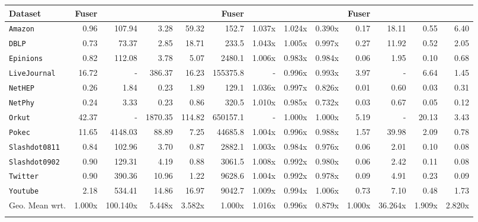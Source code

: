 \documentclass[10pt,journal,compsoc]{IEEEtran}
\newcommand\acro{{\sc{HyperFuseR\xspace}\xspace}\xspace}
\begin{document}
\begin{table}
{\begin{tabular}{l|rrrr|rrrr|rrrr}
Dataset      & {\sc Fuser} &         &         &         & {\sc Fuser} &         &         &         & {\sc Fuser} &       &       &      \\
\midrule
{\tt Amazon }       &       0.96 &  107.94 &    3.28 &  59.32 &      152.7 &  1.037x &  1.024x &  0.390x &       0.17 & 18.11 &  0.55 & 6.40 \\
{\tt DBLP }         &       0.73 &   73.37 &    2.85 &  18.71 &      233.5 &  1.043x &  1.005x &  0.997x &       0.27 & 11.92 &  0.52 & 2.05 \\
{\tt Epinions }     &       0.82 &  112.08 &    3.78 &   5.07 &     2480.1 &  1.006x &  0.983x &  0.984x &       0.06 &  1.95 &  0.10 & 0.68 \\
{\tt LiveJournal }  &      16.72 &       - &  386.37 &  16.23 &   155375.8 &       - &  0.996x &  0.993x &       3.97 &     - &  6.64 & 1.45 \\
{\tt NetHEP }       &       0.26 &    1.84 &    0.23 &   1.89 &      129.1 &  1.036x &  0.997x &  0.826x &       0.01 &  0.60 &  0.03 & 0.31 \\
{\tt NetPhy }       &       0.24 &    3.33 &    0.23 &   0.86 &      320.5 &  1.010x &  0.985x &  0.732x &       0.03 &  0.67 &  0.05 & 0.12 \\
{\tt Orkut }        &      42.37 &       - & 1870.35 & 114.82 &   650157.1 &       - &  1.000x &  1.000x &       5.19 &     - & 20.13 & 3.43 \\
{\tt Pokec }        &      11.65 & 4148.03 &   88.89 &   7.25 &    44685.8 &  1.004x &  0.996x &  0.988x &       1.57 & 39.98 &  2.09 & 0.78 \\
{\tt Slashdot0811 } &       0.84 &  102.96 &    3.70 &   0.87 &     2882.1 &  1.003x &  0.984x &  0.976x &       0.06 &  2.01 &  0.10 & 0.08 \\
{\tt Slashdot0902 } &       0.90 &  129.31 &    4.19 &   0.88 &     3061.5 &  1.008x &  0.992x &  0.980x &       0.06 &  2.42 &  0.11 & 0.08 \\
{\tt Twitter }      &       0.90 &  390.36 &   10.96 &   1.22 &     9628.6 &  1.004x &  0.992x &  0.978x &       0.09 &  4.91 &  0.23 & 0.09 \\
{\tt Youtube }      &       2.18 &  534.41 &   14.86 &  16.97 &     9042.7 &  1.009x &  0.994x &  1.006x &       0.73 &  7.10 &  0.48 & 1.73 \\
\bottomrule
Geo. Mean wrt.&1.000x&100.140x&5.448x&3.582x&1.000x&1.016x&0.996x&0.879x&1.000x&36.264x&1.909x&2.820x \\ \acro
\end{tabular}



    }
    \end{table}
\end{document}
